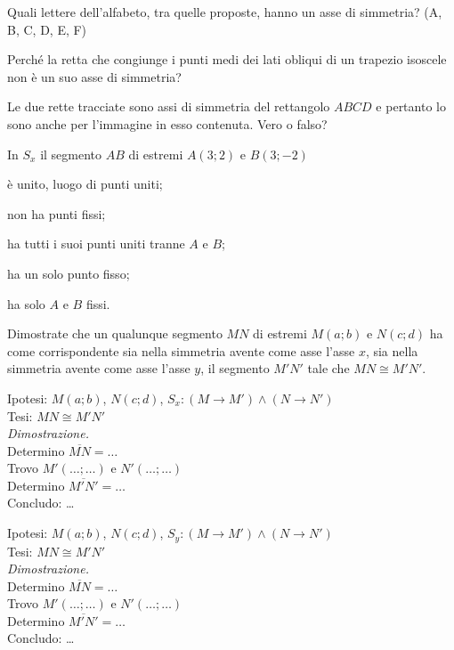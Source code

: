 \begin{esercizio}
\label{ese:8.24}
Quali lettere dell'alfabeto, tra quelle proposte, hanno un asse di simmetria? (A, B, C, D, E, F)
\end{esercizio}

\begin{esercizio}
\label{ese:8.25}
Perché la retta che congiunge i punti medi dei lati obliqui di un trapezio isoscele non è un suo asse di simmetria?
\end{esercizio}

\begin{esercizio}
\label{ese:8.26}
Le due rette tracciate sono assi di simmetria del rettangolo $ABCD$ e pertanto lo sono anche per l'immagine in esso contenuta. Vero o falso?
\end{esercizio}

\begin{esercizio}
\label{ese:8.27}
In $S_x$ il segmento $AB$ di estremi $A(3;2)$ e $B(3;-2)$
\begin{enumeratea}
\item è unito, luogo di punti uniti;
\item non ha punti fissi;
\item ha tutti i suoi punti uniti tranne $A$ e $B$;
\item ha un solo punto fisso;
\item ha solo $A$ e $B$ fissi.
\end{enumeratea}
\end{esercizio}

\begin{esercizio}
\label{ese:8.28}
Dimostrate che un qualunque segmento $MN$ di estremi $M(a;b)$ e $N(c;d)$ ha come corrispondente sia nella simmetria avente come asse l'asse $x$, sia nella simmetria avente come asse l'asse $y$, il segmento $M'N'$ tale che $MN\cong M'N'$.

\noindent Ipotesi: $M(a;b)$, $N(c;d)$, $S_x:(M\rightarrow M') \wedge (N\rightarrow N')$
\\
Tesi: $MN\cong M'N'$\vspace{5pt}\\
\emph{Dimostrazione.}\\
Determino $\overline{MN}=\ldots{}$\\
Trovo $M'(\ldots{};\ldots{})$ e $N'(\ldots{};\ldots{})$\\
Determino $\overline{M'N'}=\ldots{}$\\
Concludo: \ldots{}

\noindent Ipotesi: $M(a;b)$, $N(c;d)$, $S_y:(M\rightarrow M') \wedge (N\rightarrow N')$
\\
Tesi: $MN\cong M'N'$\vspace{5pt}\\
\emph{Dimostrazione.}\\
Determino $\overline{MN}=\ldots{}$\\
Trovo $M'(\ldots{};\ldots{})$ e $N'(\ldots{};\ldots{})$\\
Determino $\overline{M'N'}=\ldots{}$\\
Concludo: \ldots{}
\end{esercizio}

